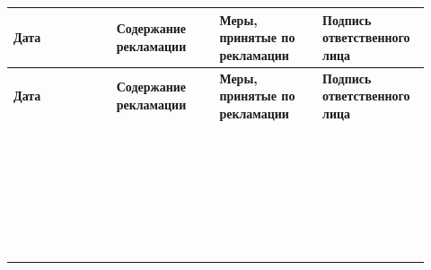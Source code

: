 \documentclass[14pt,a4paper,final]{extreport}
\newlength{\rs}
\begin{document}
\begin{center}
	\small	\begin{longtable}{|p{0.23\linewidth}|p{0.23\linewidth}|p{0.23\linewidth}|p{0.23\linewidth}|}
		
		\hline
		\textbf{Дата} & \textbf{Содержание рекламации} & \textbf{Меры, принятые по рекламации} &  \textbf{Подпись ответственного лица}   \\
		\hline
		\endfirsthead
		\textbf{Дата} & \textbf{Содержание рекламации} & \textbf{Меры, принятые по рекламации} &  \textbf{Подпись ответственного лица}   \\
		\hline
		\endhead
		
		\endfoot
		\hline
		\endlastfoot
		
		& & & \\ \hline
		& & & \\ \hline
		& & & \\ \hline
		& & & \\ \hline
		& & & \\ \hline
		& & & \\ \hline
		& & & \\ \hline
		& & & \\ \hline
		& & & \\ \hline
		& & & \\ \hline
		& & & \\ \hline
		& & & \\ \hline
		& & & \\ \hline
		& & & \\ \hline
		& & & \\ \hline
		& & & \\ \hline
		& & & \\ \hline
		& & & \\ \hline
		& & & \\ \hline
		& & & \\ \hline
		& & & \\ \hline
		& & & \\ \hline
		& & & \\ \hline
		& & & \\ \hline
		& & & \\ \hline
		& & & \\ \hline
		& & & \\ \hline
		& & & \\ \hline
		& & & \\ \hline
		
	\end{longtable}
\end{center}
\end{document}
